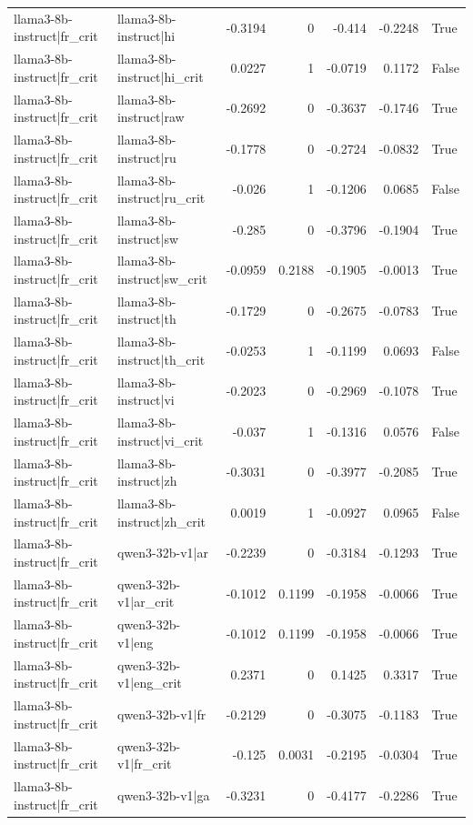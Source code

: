 \begin{table}
\begin{tabular}{l l r r r r l}
llama3-8b-instruct|fr_crit & llama3-8b-instruct|hi & -0.3194 & 0 & -0.414 & -0.2248 & True \\
llama3-8b-instruct|fr_crit & llama3-8b-instruct|hi_crit & 0.0227 & 1 & -0.0719 & 0.1172 & False \\
llama3-8b-instruct|fr_crit & llama3-8b-instruct|raw & -0.2692 & 0 & -0.3637 & -0.1746 & True \\
llama3-8b-instruct|fr_crit & llama3-8b-instruct|ru & -0.1778 & 0 & -0.2724 & -0.0832 & True \\
llama3-8b-instruct|fr_crit & llama3-8b-instruct|ru_crit & -0.026 & 1 & -0.1206 & 0.0685 & False \\
llama3-8b-instruct|fr_crit & llama3-8b-instruct|sw & -0.285 & 0 & -0.3796 & -0.1904 & True \\
llama3-8b-instruct|fr_crit & llama3-8b-instruct|sw_crit & -0.0959 & 0.2188 & -0.1905 & -0.0013 & True \\
llama3-8b-instruct|fr_crit & llama3-8b-instruct|th & -0.1729 & 0 & -0.2675 & -0.0783 & True \\
llama3-8b-instruct|fr_crit & llama3-8b-instruct|th_crit & -0.0253 & 1 & -0.1199 & 0.0693 & False \\
llama3-8b-instruct|fr_crit & llama3-8b-instruct|vi & -0.2023 & 0 & -0.2969 & -0.1078 & True \\
llama3-8b-instruct|fr_crit & llama3-8b-instruct|vi_crit & -0.037 & 1 & -0.1316 & 0.0576 & False \\
llama3-8b-instruct|fr_crit & llama3-8b-instruct|zh & -0.3031 & 0 & -0.3977 & -0.2085 & True \\
llama3-8b-instruct|fr_crit & llama3-8b-instruct|zh_crit & 0.0019 & 1 & -0.0927 & 0.0965 & False \\
llama3-8b-instruct|fr_crit & qwen3-32b-v1|ar & -0.2239 & 0 & -0.3184 & -0.1293 & True \\
llama3-8b-instruct|fr_crit & qwen3-32b-v1|ar_crit & -0.1012 & 0.1199 & -0.1958 & -0.0066 & True \\
llama3-8b-instruct|fr_crit & qwen3-32b-v1|eng & -0.1012 & 0.1199 & -0.1958 & -0.0066 & True \\
llama3-8b-instruct|fr_crit & qwen3-32b-v1|eng_crit & 0.2371 & 0 & 0.1425 & 0.3317 & True \\
llama3-8b-instruct|fr_crit & qwen3-32b-v1|fr & -0.2129 & 0 & -0.3075 & -0.1183 & True \\
llama3-8b-instruct|fr_crit & qwen3-32b-v1|fr_crit & -0.125 & 0.0031 & -0.2195 & -0.0304 & True \\
llama3-8b-instruct|fr_crit & qwen3-32b-v1|ga & -0.3231 & 0 & -0.4177 & -0.2286 & True \\

\end{tabular}
\end{table}
